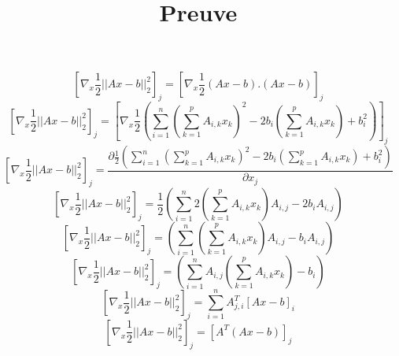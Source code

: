 \documentclass[a4paper,10pt]{article}
\title{Preuve}
\author{}
\begin{document}
\maketitle

\begin{abstract}

\end{abstract}

\section{}
\[[\nabla_{x} \frac{1}{2}||Ax - b||^{2}_{2}]_{j} = [\nabla_{x} \frac{1}{2}(Ax - b).(Ax - b)]_{j}\]
\[[\nabla_{x} \frac{1}{2}||Ax - b||^{2}_{2}]_{j} = [\nabla_{x} \frac{1}{2}(\sum^{n}_{i = 1} (\sum^{p}_{k = 1} A_{i, k}x_{k})^{2} - 2b_{i}(\sum^{p}_{k = 1} A_{i, k}x_{k}) + b_{i}^{2})]_{j}\]
\[[\nabla_{x} \frac{1}{2}||Ax - b||^{2}_{2}]_{j} = \frac{\partial\frac{1}{2}(\sum^{n}_{i = 1} (\sum^{p}_{k = 1} A_{i, k}x_{k})^{2} - 2b_{i}(\sum^{p}_{k = 1} A_{i, k}x_{k}) + b_{i}^{2})}{\partial x_{j}}\]
\[[\nabla_{x} \frac{1}{2}||Ax - b||^{2}_{2}]_{j} = \frac{1}{2}(\sum^{n}_{i = 1} 2(\sum^{p}_{k = 1} A_{i, k}x_{k})A_{i, j} - 2b_{i} A_{i, j}) \]
\[[\nabla_{x} \frac{1}{2}||Ax - b||^{2}_{2}]_{j} = (\sum^{n}_{i = 1} (\sum^{p}_{k = 1} A_{i, k}x_{k})A_{i, j} - b_{i} A_{i, j}) \]
\[[\nabla_{x} \frac{1}{2}||Ax - b||^{2}_{2}]_{j} = (\sum^{n}_{i = 1} A_{i, j}(\sum^{p}_{k = 1} A_{i, k}x_{k}) - b_{i} ) \]
\[[\nabla_{x} \frac{1}{2}||Ax - b||^{2}_{2}]_{j} = \sum^{n}_{i = 1} A^{T}_{j, i}[Ax - b]_{i}\]
\[[\nabla_{x} \frac{1}{2}||Ax - b||^{2}_{2}]_{j} = [A^{T}(Ax - b)]_{j}\]
\end{document}
